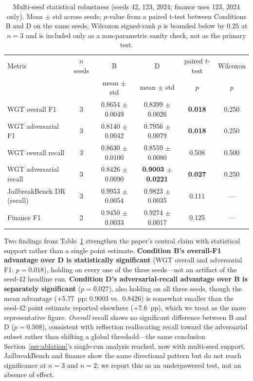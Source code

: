 \documentclass[Superintelligence,article,submit,pdftex,moreauthors]{Definitions/mdpi}
\begin{document}
\begin{table}[H]
  \caption{Multi-seed statistical robustness (seeds 42, 123, 2024; finance uses 123, 2024 only). Mean $\pm$ std across seeds; $p$-value from a paired t-test between Conditions B and D on the same seeds. Wilcoxon signed-rank $p$ is bounded below by $0.25$ at $n=3$ and is included only as a non-parametric sanity check, not as the primary test.\label{tab:multiseed}}
  \centering
  \small
  \setlength{\tabcolsep}{4pt}
  \begin{tabular}{lccccc}
    \toprule
    Metric & $n$ seeds & B & D & paired $t$-test & Wilcoxon \\
           &           & mean $\pm$ std & mean $\pm$ std & $p$ & $p$ \\
    \midrule
    WGT overall F1         & 3 & 0.8654 $\pm$ 0.0049 & 0.8399 $\pm$ 0.0026 & \textbf{0.018} & 0.250 \\
    WGT adversarial F1     & 3 & 0.8140 $\pm$ 0.0042 & 0.7956 $\pm$ 0.0079 & \textbf{0.018} & 0.250 \\
    WGT overall recall     & 3 & 0.8630 $\pm$ 0.0100 & 0.8559 $\pm$ 0.0080 & 0.508 & 0.500 \\
    WGT adversarial recall & 3 & 0.8426 $\pm$ 0.0090 & \textbf{0.9003 $\pm$ 0.0221} & \textbf{0.027} & 0.250 \\
    \makecell[l]{JailbreakBench DR\\(recall)}
                           & 3 & 0.9953 $\pm$ 0.0054 & 0.9823 $\pm$ 0.0035 & 0.111 & --- \\
    Finance F1             & 2 & 0.9450 $\pm$ 0.0033 & 0.9274 $\pm$ 0.0017 & 0.125 & --- \\
    \bottomrule
  \end{tabular}
\end{table}

Two findings from Table~\ref{tab:multiseed} strengthen the paper's central claim with statistical support rather than a single point estimate. \textbf{Condition B's overall-F1 advantage over D is statistically significant} (WGT overall and adversarial F1: $p=0.018$), holding on every one of the three seeds---not an artifact of the seed-42 headline run. \textbf{Condition D's adversarial-recall advantage over B is separately significant} ($p=0.027$), also holding on all three seeds, though the mean advantage (+5.77~pp: 0.9003 vs.\ 0.8426) is somewhat smaller than the seed-42 point estimate reported elsewhere (+7.6~pp), which we treat as the more representative figure. \emph{Overall} recall shows no significant difference between B and D ($p=0.508$), consistent with reflection reallocating recall toward the adversarial subset rather than shifting a global threshold---the same conclusion Section~\ref{sec:ablation}'s single-run analysis reached, now with multi-seed support. JailbreakBench and finance show the same directional pattern but do not reach significance at $n=3$ and $n=2$; we report this as an underpowered test, not an absence of effect.
\end{document}
